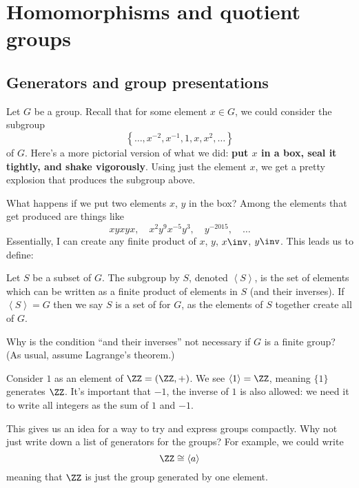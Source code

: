 \chapter{Homomorphisms and quotient groups}
\label{ch:homomorphisms_quotient}
\section{Generators and group presentations}

Let $G$ be a group.
Recall that for some element $x \in G$,
we could consider the subgroup
\[ \left\{ \dots, x^{-2}, x^{-1}, 1, x, x^2, \dots \right\} \]
of $G$.
Here's a more pictorial version of what we did:
\textbf{put $x$ in a box, seal it tightly, and shake vigorously}.
Using just the element $x$,
we get a pretty explosion that produces the subgroup above.

What happens if we put two elements $x$, $y$ in the box?
Among the elements that get produced are things like
\[ xyxyx, \quad x^2y^9x^{-5}y^3, \quad y^{-2015}, \quad \dots\]
Essentially, I can create any finite product of $x$, $y$, $x\inv$, $y\inv$.
This leads us to define:
\begin{definition}
	Let $S$ be a subset of $G$.
	The subgroup  by $S$,
	denoted $\left<S\right>$,
	is the set of elements which can be written as a
	finite product of elements in $S$ (and their inverses).
	If $\left<S\right> = G$ then we say $S$ is a set of
	 for $G$,
	as the elements of $S$ together create all of $G$.
\end{definition}
\begin{exercise}
	Why is the condition ``and their inverses''
	not necessary if $G$ is  a finite group?
	(As usual, assume Lagrange's theorem.)
\end{exercise}

\begin{example}
	Consider $1$ as an element of $\ZZ = (\ZZ, +)$.
	We see $\left<1\right> = \ZZ$, meaning $\{1\}$ generates $\ZZ$.
	It's important that $-1$, the inverse of $1$ is also allowed:
	we need it to write all integers as the sum of $1$ and $-1$.
\end{example}

This gives us an idea for a way to try and express groups compactly.
Why not just write down a list of generators for the groups?
For example, we could write
\[ \ZZ \cong \left< a \right> \]
meaning that $\ZZ$ is just the group generated by one element.

